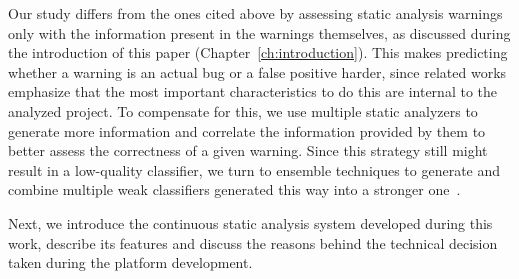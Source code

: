 Our study differs from the ones cited above by assessing static analysis
warnings only with the information present in the warnings themselves, as
discussed during the introduction of this paper
(Chapter~\ref{ch:introduction}).  This makes predicting whether a warning is
an actual bug or a false positive harder, since related works emphasize that
the most important characteristics to do this are internal to the analyzed
project. To compensate for this, we use multiple static analyzers to generate
more information and correlate the information provided by them to better
assess the correctness of a given warning.  Since this strategy still might
result in a low-quality classifier, we turn to ensemble techniques to generate
and combine multiple weak classifiers generated this way into a stronger
one~\cite{aima}.

Next, we introduce the continuous static analysis system developed during this
work, describe its features and discuss the reasons behind the technical
decision taken during the platform development.
